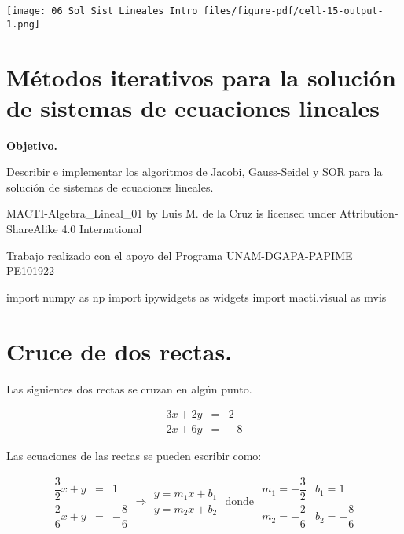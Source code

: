 \documentclass[
  letterpaper,
  DIV=11,
  numbers=noendperiod]{scrreprt}
\newenvironment{Shaded}{\begin{snugshade}}{\end{snugshade}}
\newcommand{\ImportTok}[1]{\textcolor[rgb]{0.00,0.46,0.62}{#1}}
\newcommand{\NormalTok}[1]{\textcolor[rgb]{0.00,0.23,0.31}{#1}}
\begin{document}
\texttt{[image: 06\_Sol\_Sist\_Lineales\_Intro\_files/figure-pdf/cell-15-output-1.png]}


\chapter{Métodos iterativos para la solución de sistemas de ecuaciones
lineales}\label{muxe9todos-iterativos-para-la-soluciuxf3n-de-sistemas-de-ecuaciones-lineales}

\textbf{Objetivo.}

Describir e implementar los algoritmos de Jacobi, Gauss-Seidel y SOR
para la solución de sistemas de ecuaciones lineales.

MACTI-Algebra\_Lineal\_01 by Luis M. de la Cruz is licensed under
Attribution-ShareAlike 4.0 International

Trabajo realizado con el apoyo del Programa UNAM-DGAPA-PAPIME PE101922

\begin{Shaded}
\begin{Highlighting}[]
\ImportTok{import}\NormalTok{ numpy }\ImportTok{as}\NormalTok{ np}
\ImportTok{import}\NormalTok{ ipywidgets }\ImportTok{as}\NormalTok{ widgets}
\ImportTok{import}\NormalTok{ macti.visual }\ImportTok{as}\NormalTok{ mvis}
\end{Highlighting}
\end{Shaded}


\chapter{Cruce de dos rectas.}\label{cruce-de-dos-rectas.}

Las siguientes dos rectas se cruzan en algún punto.

\[
\begin{array}{ccc}
3x + 2y & = &2 \\
2x + 6y & = &-8
\end{array}
\]

Las ecuaciones de las rectas se pueden escribir como:

\[
\begin{array}{ccc}
\dfrac{3}{2}x + y & = & 1 \\
\dfrac{2}{6}x + y & = & -\dfrac{8}{6}
\end{array} \Longrightarrow
\begin{array}{ccc}
y = m_1 x + b_1 \\
y = m_2 x + b_2
\end{array} \text{ donde }
\begin{array}{ccc}
m_1 = -\dfrac{3}{2} & b_1 = 1 \\
m_2 = -\dfrac{2}{6} & b_2 = -\dfrac{8}{6}
\end{array}
\]
\end{document}
